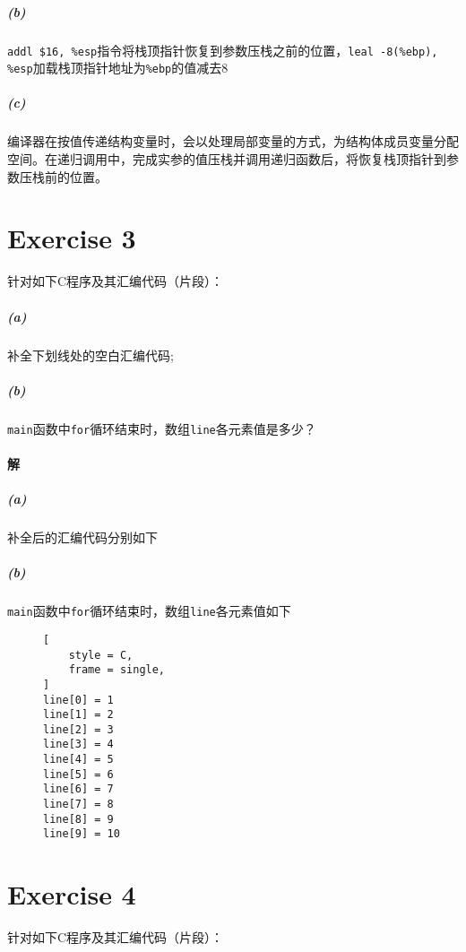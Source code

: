 \documentclass{article}
\newcommand{\CodeBlock}[2]{
    \begin{figure}[H]
        \begin{mdframed}[
            style = Default,
        ]
            
        \end{mdframed}
    \end{figure}
}
\begin{document}
\begin{multicols}{2}
\CodeBlock{Assembler}{./Ex2_N=2_Filled.s}
\CodeBlock{Assembler}{./Ex2_N=11_Filled.s}
\end{multicols}
\subparagraph*{(b)}
\lstinline[style = Assembler]{addl $16, %esp}指令将栈顶指针恢复到参数压栈之前的位置，\lstinline[style = Assembler]{leal -8(%ebp), %esp}加载栈顶指针地址为\lstinline[style = Assembler]{%ebp}的值减去8
\subparagraph{(c)}
编译器在按值传递结构变量时，会以处理局部变量的方式，为结构体成员变量分配空间。在递归调用中，完成实参的值压栈并调用递归函数后，将恢复栈顶指针到参数压栈前的位置。

\FloatBarrier

\newpage

\section*{Exercise 3}
针对如下C程序及其汇编代码（片段）：

\begin{multicols}{2}
\CodeBlock{C}{./Ex3.c}

\CodeBlock{Assembler}{./Ex3_g.s}

\CodeBlock{Assembler}{./Ex3_main.s}
\end{multicols}

\subparagraph*{(a)}
补全下划线处的空白汇编代码;
\subparagraph*{(b)}
\texttt{main}函数中\texttt{for}循环结束时，数组\texttt{line}各元素值是多少？

\paragraph{解}
\subparagraph*{(a)}
补全后的汇编代码分别如下

\begin{multicols}{2}
\CodeBlock{Assembler}{./Ex3_g_Filled.s}
\subparagraph*{(b)}
\texttt{main}函数中\texttt{for}循环结束时，数组\texttt{line}各元素值如下
\begin{figure}[H]
\begin{lstlisting}[
    style = C,
    frame = single,
]
line[0] = 1
line[1] = 2
line[2] = 3
line[3] = 4
line[4] = 5
line[5] = 6
line[6] = 7
line[7] = 8
line[8] = 9
line[9] = 10
\end{lstlisting}
\end{figure}
\CodeBlock{Assembler}{./Ex3_main_Filled.s}
\end{multicols}




\section*{Exercise 4}
针对如下C程序及其汇编代码（片段）：
\end{document}
